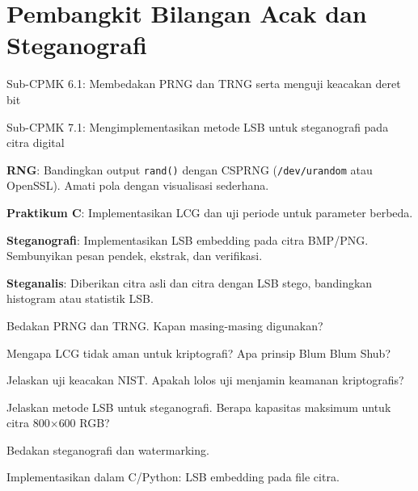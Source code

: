\documentclass[main.tex]{subfiles}
\begin{document}
\chapter{Pembangkit Bilangan Acak dan Steganografi}

\begin{subcpmk}
  \item Sub-CPMK 6.1: Membedakan PRNG dan TRNG serta menguji keacakan deret bit
  \item Sub-CPMK 7.1: Mengimplementasikan metode LSB untuk steganografi pada citra digital
\end{subcpmk}






\begin{aktivitas}
  \item \textbf{RNG}: Bandingkan output \texttt{rand()} dengan CSPRNG (\texttt{/dev/urandom} atau OpenSSL). Amati pola dengan visualisasi sederhana.

  \item \textbf{Praktikum C}: Implementasikan LCG dan uji periode untuk parameter berbeda.

  \item \textbf{Steganografi}: Implementasikan LSB embedding pada citra BMP/PNG. Sembunyikan pesan pendek, ekstrak, dan verifikasi.

  \item \textbf{Steganalis}: Diberikan citra asli dan citra dengan LSB stego, bandingkan histogram atau statistik LSB.
\end{aktivitas}


\begin{latihan}
  \item Bedakan PRNG dan TRNG. Kapan masing-masing digunakan?

  \item Mengapa LCG tidak aman untuk kriptografi? Apa prinsip Blum Blum Shub?

  \item Jelaskan uji keacakan NIST. Apakah lolos uji menjamin keamanan kriptografis?

  \item Jelaskan metode LSB untuk steganografi. Berapa kapasitas maksimum untuk citra 800$\times$600 RGB?

  \item Bedakan steganografi dan watermarking.

  \item Implementasikan dalam C/Python: LSB embedding pada file citra.
\end{latihan}
\end{document}
